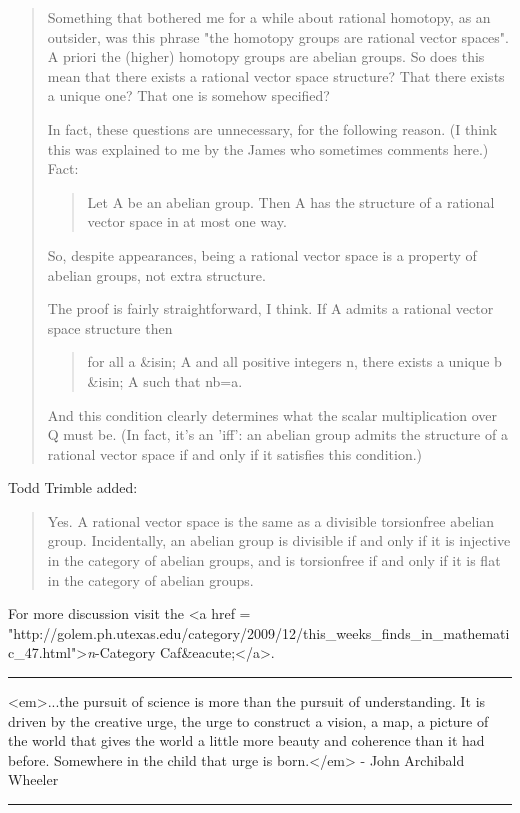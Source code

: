 \begin{quote}

Something that bothered me for a while about rational homotopy, as an
outsider, was this phrase "the homotopy groups are rational vector
spaces".  A priori the (higher) homotopy groups are abelian groups.
So does this mean that there exists a rational vector space structure?
That there exists a unique one?  That one is somehow specified?


In fact, these questions are unnecessary, for the following reason.
(I think this was explained to me by the James who sometimes comments
here.)  Fact:

\begin{quote}
    Let A be an abelian group.  Then A has the structure of a rational
    vector space in at most one way.
\end{quote}

So, despite appearances, being a rational vector space is a property
of abelian groups, not extra structure.

The proof is fairly straightforward, I think.  If A admits a rational
vector space structure then

\begin{quote}
    for all a &isin; A and all positive integers n, there exists a unique b 
&isin; A such that nb=a.
\end{quote}

And this condition clearly determines what the scalar multiplication
over Q must be.  (In fact, it's an 'iff': an abelian group admits the
structure of a rational vector space if and only if it satisfies this
condition.)

\end{quote}

Todd Trimble added:

\begin{quote}

Yes. A rational vector space is the same as a divisible torsionfree
abelian group. Incidentally, an abelian group is divisible if and only
if it is injective in the category of abelian groups, and is
torsionfree if and only if it is flat in the category of abelian
groups.

\end{quote}

For more discussion visit the <a href =
"http://golem.ph.utexas.edu/category/2009/12/this_weeks_finds_in_mathematic_47.html">\emph{n}-Category
Caf&eacute;</a>.

\par\noindent\rule{\textwidth}{0.4pt}
<em>...the pursuit of science is more than the pursuit of understanding. 
It is driven by the creative urge, the urge to construct a vision, a 
map, a picture of the world that gives the world a little more beauty 
and coherence than it had before.  Somewhere in the child that urge 
is born.</em> - John Archibald Wheeler

\par\noindent\rule{\textwidth}{0.4pt}

